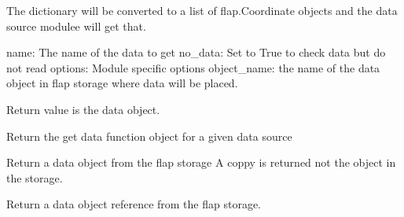 \documentclass[letterpaper,10pt,english]{sphinxmanual}
\begin{document}
\begin{fulllineitems}
\begin{enumerate}
\begin{description}
\begin{itemize}
\end{itemize}

\end{description}

The dictionary will be converted to a list of flap.Coordinate objects and
the data source modulee will get that.

\end{enumerate}

name: The name of the data to get
no\_data: Set to True to check data but do not read
options: Module specific options
object\_name: the name of the data object in flap storage where data will be placed.

Return value is the data object.

\end{fulllineitems}


\begin{fulllineitems}
\label{\detokenize{data_object:flap.data_object.get_data_function}}
Return the get data function object for a given data source

\end{fulllineitems}


\begin{fulllineitems}
\label{\detokenize{data_object:flap.data_object.get_data_object}}
Return a data object from the flap storage
A coppy is returned not the object in the storage.

\end{fulllineitems}


\begin{fulllineitems}
\label{\detokenize{data_object:flap.data_object.get_data_object_ref}}
Return a data object reference from the flap storage.

\end{fulllineitems}
\end{document}
